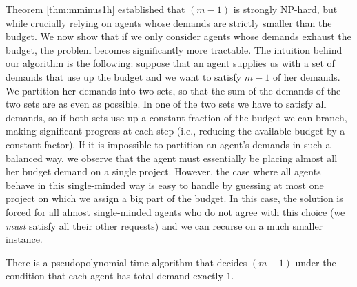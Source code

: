\documentclass{article}
\begin{document}
Theorem \ref{thm:mminus1h} established that \AAS$(m-1)$ is strongly NP-hard, but while crucially relying on agents whose demands are strictly smaller than the budget. We now show that if we only consider agents whose demands exhaust the budget, the problem becomes significantly more tractable. The intuition behind our algorithm is the following: suppose that an agent supplies us with a set of demands that use up the budget and we want to satisfy $m-1$ of her demands. We partition her demands into two sets, so that the sum of the demands of the two sets are as even as possible. In one of the two sets we have to satisfy all demands, so if both sets use up a constant fraction of the budget we can branch, making significant progress at each step (i.e., reducing the available budget by a constant factor). If it is impossible to partition an agent's demands in such a balanced way, we observe that the agent must essentially be placing almost all her budget demand on a single project. However, the case where all agents behave in this single-minded way is easy to handle by guessing at most one project on which we assign a big part of the budget. In this case, the solution is forced for all almost single-minded agents who do not agree with this choice (we \emph{must} satisfy all their other requests) and we can recurse on a much smaller instance.   

\begin{theorem}\label{thm:mminus1p} There is a pseudopolynomial time algorithm
that decides \AAS$(m-1)$  
under the condition that each agent has total demand exactly $1$. 
\end{theorem}
\end{document}
